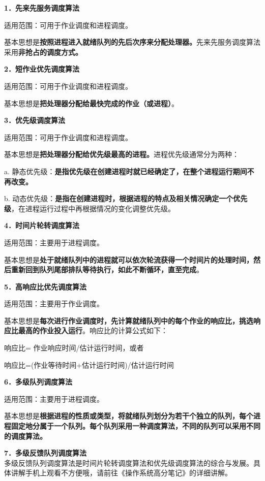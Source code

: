 \textbf{{1．先来先服务调度算法}}

{{适用范围：可用于作业调度和进程调度。}}

基本思想是\textbf{{按照进程进入就绪队列的先后次序来分配处理器}。}先来先服务调度算法采用\textbf{非抢占的调度方式。}

\textbf{{2．短作业优先调度算法}}

{{适用范围：可用于作业调度和进程调度。}{}}

基本思想是\textbf{{把处理器分配给最快完成的作业（或进程）}}{。\\
}

\textbf{{3．优先级调度算法}}

{{{适用范围：可用于作业调度和进程调度。}{}}}

基本思想是\textbf{{把处理器分配给优先级最高的进程}。}{进程优先级通常分为两种：}

a.
静态优先级：\textbf{是指优先级在创建进程时就已经确定了，在整个进程运行期间不再改变。}

b.
动态优先级：\textbf{是指在创建进程时，根据进程的特点及相关情况确定一个优先级}，在进程运行过程中再根据情况的变化调整优先级。

\textbf{{4．时间片轮转调度算法}}

{{{适用范围：主要用于进程调度。}{}}}

基本思想是{\textbf{处于就绪队列中的进程就可以}}\textbf{{依次轮流获得一个时间片的处理时间}}{\textbf{，然后重新回到队列尾部排队等待执行，如此不断循环，直至完成}}。

\textbf{{5．高响应比优先调度算法}}

{{{适用范围：主要用于作业调度。}}}

基本思想是{\textbf{每次进行作业调度时，先计算就绪队列中的每个作业的响应比，挑选响应比最高的作业投入运行}}。响应比的计算公式如下：

响应比= 作业响应时间/估计运行时间，或者

响应比=(作业等待时间+估计运行时间)/估计运行时间

\textbf{{6．多级队列调度算法}}

{{{适用范围：主要用于进程调度。}{}}{}}

基本思想是\textbf{{根据进程的性质或类型，将就绪队列划分为若干个独立的队列，每个进程固定地分属于一个队列。}{每个队列采用一种调度算法，不同的队列可以采用不同的调度算法。}}

\textbf{{7．多级反馈队列调度算法}}\\

多级反馈队列调度算法是时间片轮转调度算法和优先级调度算法的综合与发展。具体讲解手机上观看不方便哦，请前往《操作系统高分笔记》的详细讲解。
